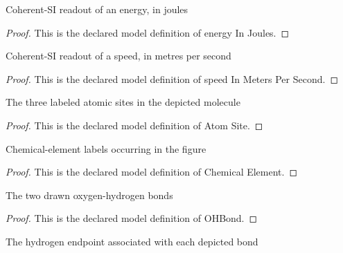 \begin{definition}
  \label{def:physics:phyx-mini-0571:phyxminiproblems-problemphyxmini0571-energyinjoules}
  Coherent-SI readout of an energy, in joules
\end{definition}
\begin{proof}
  This is the declared model definition of energy In Joules.
\end{proof}
\begin{definition}
  \label{def:physics:phyx-mini-0571:phyxminiproblems-problemphyxmini0571-speedinmeterspersecond}
  Coherent-SI readout of a speed, in metres per second
\end{definition}
\begin{proof}
  This is the declared model definition of speed In Meters Per Second.
\end{proof}
\begin{definition}
  \label{def:physics:phyx-mini-0571:phyxminiproblems-problemphyxmini0571-atomsite}
  The three labeled atomic sites in the depicted molecule
\end{definition}
\begin{proof}
  This is the declared model definition of Atom Site.
\end{proof}
\begin{definition}
  \label{def:physics:phyx-mini-0571:phyxminiproblems-problemphyxmini0571-chemicalelement}
  Chemical-element labels occurring in the figure
\end{definition}
\begin{proof}
  This is the declared model definition of Chemical Element.
\end{proof}
\begin{definition}[OHBond]
  \label{def:physics:phyx-mini-0571:phyxminiproblems-problemphyxmini0571-ohbond}
  The two drawn oxygen-hydrogen bonds
\end{definition}
\begin{proof}
  This is the declared model definition of OHBond.
\end{proof}
\begin{definition}
  \label{def:physics:phyx-mini-0571:phyxminiproblems-problemphyxmini0571-ohbond-hydrogensite}
  The hydrogen endpoint associated with each depicted bond
\end{definition}
